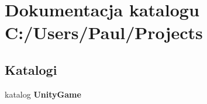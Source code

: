\section{Dokumentacja katalogu C\+:/\+Users/\+Paul/\+Projects}
\label{dir_5e5b3a6342ca8c7679cc7d29546e8879}
\subsection*{Katalogi}
\begin{DoxyCompactItemize}
\item 
katalog {\bf Unity\+Game}
\end{DoxyCompactItemize}
